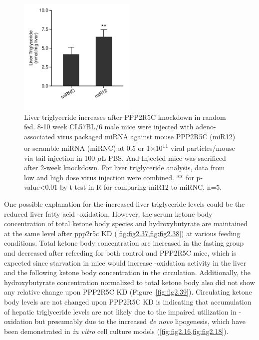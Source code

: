 \begin{figure}
\centering
\includegraphics[width=0.5\textwidth]{figs/fig2-57 liver pilot tag.pdf}
\caption[Liver triglyceride increases in the pilot experiment]{\footnotesize Liver triglyceride increases after PPP2R5C knockdown in random fed. 8-10 week CL57BL/6 male mice were injected with adeno-associated virus packaged miRNA against mouse PPP2R5C (miR12) or scramble miRNA (miRNC) at 0.5 or 1$\times$10\textsuperscript{11} viral particles/mouse via tail injection in 100 $\mu$L PBS. And Injected mice was sacrificed after 2-week knockdown. For liver triglyceride analysis, data from low and high dose virus injection were combined. ** for p-value<0.01 by t-test in R for comparing miR12 to miRNC. n=5.}
\label{fig:fig2.57}
\end{figure}


One possible explanation for the increased liver triglyceride levels could be the reduced liver fatty acid \textbeta{}-oxidation. However, the serum ketone body concentration of total ketone body species and hydroxybutyrate are maintained at the same level after \gls{ppp2r5c} KD (\cref{fig:fig2.37,fig:fig2.38}) at various feeding conditions. Total ketone body concentration are increased in the fasting group and decreased after refeeding for both control and PPP2R5C mice, which is expected since starvation in mice would increase \textbeta{}-oxidation activity in the liver and the following ketone body concentration in the circulation. Additionally, the hydroxybutyrate concentration normalized to total ketone body also did not show any relative change upon PPP2R5C KD (Figure~\ref{fig:fig2.39}). Circulating ketone body levels are not changed upon PPP2R5C KD is indicating that accumulation of hepatic triglyceride levels are not likely due to the impaired utilization in \textbeta{}-oxidation but presumably due to the increased \textit{de novo} lipogenesis, which have been demonstrated in \textit{in vitro} cell culture models (\cref{fig:fig2.16,fig:fig2.18}). 

